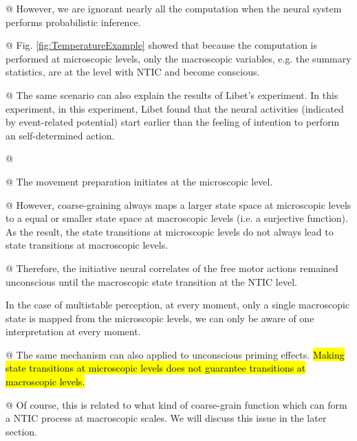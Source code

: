 \documentclass[utf8]{article}
\newenvironment{ants}
			{
			 \begin{easylist}[itemize]
		 	}
			{
			\end{easylist}
			} %
\newcommand{\highlight}[2][Yellow]{\sethlcolor{#1}\hl{#2}}
\newcommand{\ideaCallout}[1]{\todo[color=Thistle!50!white, size=\small]{#1}}
\begin{document}
\begin{ants}
        	    @ However, we are ignorant nearly all the computation when the neural system performs probabilistic inference. 
        	    
        	    @ Fig. \ref{fig:TemperatureExample} showed that because the computation is performed at microscopic levels, only the macroscopic variables, e.g. the summary statistics, are at the level with NTIC and become conscious. 
        	    
        	    
        	    
        	    @ The same scenario can also explain the results of Libet's experiment. In this experiment, in this experiment, Libet found that the neural activities (indicated by event-related potential) start earlier than the feeling of intention to perform an self-determined action. 
        	    
        	    @ \citeauthor{schurger2012accumulat}
        	    
        	    @ The movement preparation initiates at the microscopic level. 
        	    
        	    @ However, coarse-graining always maps a larger state space at microscopic levels to a equal or smaller state space at macroscopic levels (i.e. a surjective function). As the result, the state transitions at microscopic levels do not always lead to state transitions at macroscopic levels.
        	    
        	    @ Therefore, the initiative neural correlates of the free motor actions remained unconscious until the macroscopic state transition at the NTIC level. 
        	    
        	    In the case of multistable perception, at every moment, only a single macroscopic state is mapped from the microscopic levels, we can only be aware of one interpretation at every moment. 
        	    
        	    
        	    @ The same mechanism can also applied to unconscious priming effects. \highlight{Making state transitions at microscopic levels does not guarantee transitions at macroscopic levels.}\ideaCallout{this is the key sentence}
        	    
        	    @ Of course, this is related to what kind of coarse-grain function which can form a NTIC process at macroscopic scales. We will discuss this issue in the later section.
        	    
        	   
        	   

\end{ants}
\end{document}
